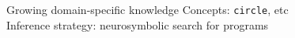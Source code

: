 \documentclass{beamer}
\newcommand{\code}[1]{{\footnotesize\texttt{#1}}}
\newcommand\Wider[2][3em]{%
\makebox[\linewidth][c]{%
  \begin{minipage}{\dimexpr\textwidth+#1\relax}
  \raggedright#2
  \end{minipage}%
  }%
}
\begin{document}
\begin{frame}{Growing domain-specific knowledge}
{  \vspace{0.2cm}Concepts: \code{circle}, etc\\Inference strategy: neurosymbolic search for programs
    }

  
\end{frame}
\end{document}
